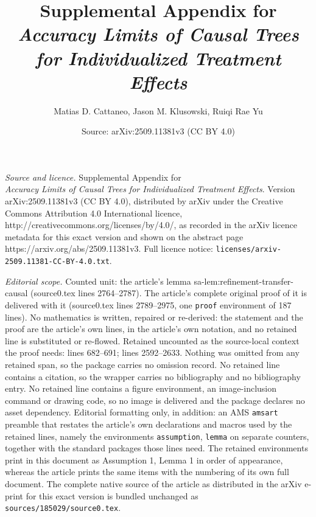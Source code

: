 \documentclass[10pt,a4paper]{amsart}
\title{Supplemental Appendix for\\ \emph{Accuracy Limits of Causal Trees for Individualized Treatment Effects}}
\author{Matias D. Cattaneo, Jason M. Klusowski, Ruiqi Rae Yu}
\date{Source: arXiv:2509.11381v3 (CC BY 4.0)}
\begin{document}
\maketitle

\noindent\emph{Source and licence.} Supplemental Appendix for\\ \emph{Accuracy Limits of Causal Trees for Individualized Treatment Effects}. Version arXiv:2509.11381v3 (CC BY 4.0), distributed by arXiv under the Creative Commons Attribution 4.0 International licence, http://creativecommons.org/licenses/by/4.0/, as recorded in the arXiv licence metadata for this exact version and shown on the abstract page https://arxiv.org/abs/2509.11381v3. Full licence notice: \texttt{licenses/arxiv-2509.11381-CC-BY-4.0.txt}.\par\smallskip

\noindent\textit{Editorial scope.} Counted unit: the article's lemma sa-lem:refinement-transfer-causal (source0.tex lines 2764--2787). The article's complete original proof of it is delivered with it (source0.tex lines 2789--2975, one \texttt{proof} environment of 187 lines). No mathematics is written, repaired or re-derived: the statement and the proof are the article's own lines, in the article's own notation, and no retained line is substituted or re-flowed.  Retained uncounted as the source-local context the proof needs: lines 682--691; lines 2592--2633.  Nothing was omitted from any retained span, so the package carries no omission record.  No retained line contains a citation, so the wrapper carries no bibliography and no bibliography entry.  No retained line contains a figure environment, an image-inclusion command or drawing code, so no image is delivered and the package declares no asset dependency.  Editorial formatting only, in addition: an AMS \texttt{amsart} preamble that restates the article's own declarations and macros used by the retained lines, namely the environments \texttt{assumption}, \texttt{lemma} on separate counters, together with the standard packages those lines need.  The retained environments print in this document as Assumption 1, Lemma 1 in order of appearance, whereas the article prints the same items with the numbering of its own full document.  The complete native source of the article as distributed in the arXiv e-print for this exact version is bundled unchanged as \texttt{sources/185029/source0.tex}.
\end{document}

